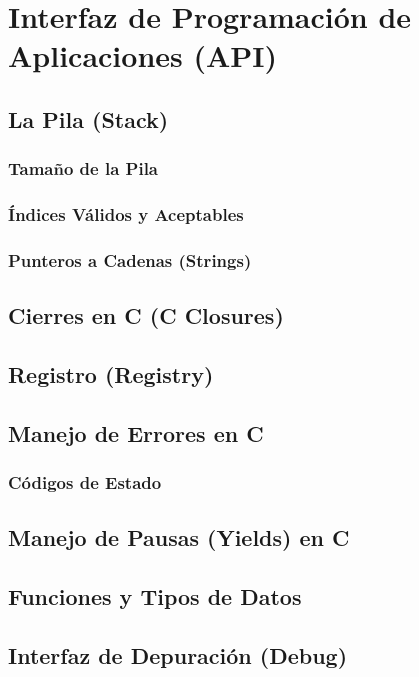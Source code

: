 \chapter{Interfaz de Programación de Aplicaciones (API)}
\lipsum[1-2]

\section{La Pila (Stack)}
\lipsum[1-2]

\subsection{Tamaño de la Pila}
\lipsum[1-2]

\subsection{Índices Válidos y Aceptables}
\lipsum[1-2]

\subsection{Punteros a Cadenas (Strings)}
\lipsum[1-2]

\section{Cierres en C (C Closures)}
\lipsum[1-2]

\section{Registro (Registry)}
\lipsum[1-2]

\section{Manejo de Errores en C}
\lipsum[1-2]

\subsection{Códigos de Estado}
\lipsum[1-2]

\section{Manejo de Pausas (Yields) en C}
\lipsum[1-2]

\section{Funciones y Tipos de Datos}
\lipsum[1-2]

\section{Interfaz de Depuración (Debug)}
\lipsum[1-2]
